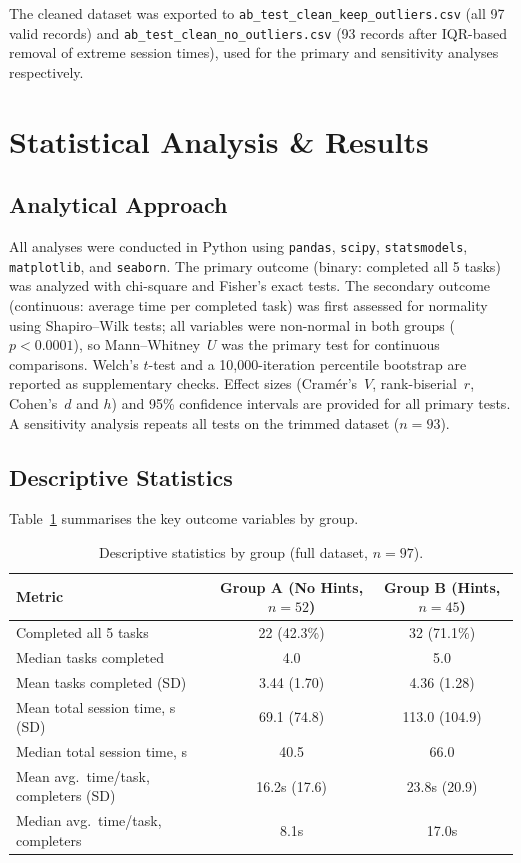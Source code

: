 \documentclass[11pt, a4paper]{article}
\begin{document}
The cleaned dataset was exported to \texttt{ab\_test\_clean\_keep\_outliers.csv}
(all 97 valid records) and \texttt{ab\_test\_clean\_no\_outliers.csv} (93 records
after IQR-based removal of extreme session times), used for the primary and
sensitivity analyses respectively.

\section{Statistical Analysis \& Results}

\subsection{Analytical Approach}

All analyses were conducted in Python using \texttt{pandas}, \texttt{scipy},
\texttt{statsmodels}, \texttt{matplotlib}, and \texttt{seaborn}. The primary
outcome (binary: completed all 5 tasks) was analyzed with chi-square and
Fisher's exact tests. The secondary outcome (continuous: average time per
completed task) was first assessed for normality using Shapiro--Wilk tests;
all variables were non-normal in both groups ($p < 0.0001$), so Mann--Whitney~$U$
was the primary test for continuous comparisons. Welch's $t$-test and a
10{,}000-iteration percentile bootstrap are reported as supplementary checks.
Effect sizes (Cram\'er's~$V$, rank-biserial~$r$, Cohen's~$d$ and $h$) and 95\%
confidence intervals are provided for all primary tests. A sensitivity analysis
repeats all tests on the trimmed dataset ($n=93$).

\subsection{Descriptive Statistics}

Table~\ref{tab:desc} summarises the key outcome variables by group.

\begin{table}[H]
\centering
\caption{Descriptive statistics by group (full dataset, $n=97$).}
\label{tab:desc}
\begin{tabular}{lcc}
\toprule
\textbf{Metric} & \textbf{Group A (No Hints, $n=52$)} & \textbf{Group B (Hints, $n=45$)} \\
\midrule
Completed all 5 tasks & 22 (42.3\%) & 32 (71.1\%) \\
Median tasks completed & 4.0 & 5.0 \\
Mean tasks completed (SD) & 3.44 (1.70) & 4.36 (1.28) \\
Mean total session time, s (SD) & 69.1 (74.8) & 113.0 (104.9) \\
Median total session time, s & 40.5 & 66.0 \\
Mean avg.\ time/task, completers (SD) & 16.2s (17.6) & 23.8s (20.9) \\
Median avg.\ time/task, completers & 8.1s & 17.0s \\
\bottomrule
\end{tabular}
\end{table}
\end{document}

